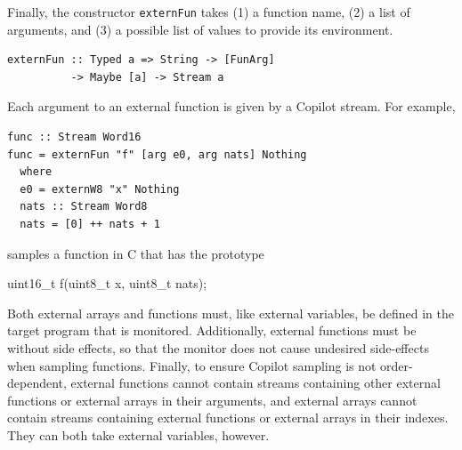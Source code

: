 Finally, the constructor \texttt{externFun} takes (1) a function name, (2) a
list of arguments, and (3) a possible list of values to provide its environment.
%
\begin{lstlisting}[language = Copilot, frame = single]
externFun :: Typed a => String -> [FunArg] 
          -> Maybe [a] -> Stream a
\end{lstlisting}
%
Each argument to an external function is given by a Copilot stream.  For
example,
%
\begin{lstlisting}[language = Copilot, frame = single]
func :: Stream Word16
func = externFun "f" [arg e0, arg nats] Nothing
  where
  e0 = externW8 "x" Nothing
  nats :: Stream Word8
  nats = [0] ++ nats + 1
\end{lstlisting} 
samples a function in C that has the prototype
%
\begin{code}[frame = single]
uint16_t f(uint8_t x, uint8_t nats);
\end{code}
% 

Both external arrays and functions must, like external variables, be defined
in the target program that is monitored. Additionally, external functions must be
without side effects, so that the monitor does not cause undesired side-effects when
sampling functions.  Finally, to ensure Copilot sampling is not
order-dependent, external functions cannot contain streams containing other
external functions or external arrays in their arguments, and external arrays
cannot contain streams containing external functions or external arrays in their
indexes.  They can both take external variables, however.



